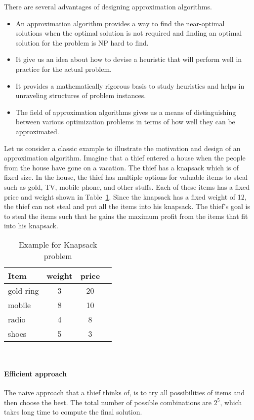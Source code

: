 There are several advantages of designing approximation algorithms.
 \begin{itemize}
  \item An approximation algorithm provides a way to find the near-optimal solutions when the optimal solution is not required and finding an optimal solution for the problem is NP hard to find.
  \item It give us an idea about how to devise a heuristic that will perform well in practice for the actual problem.
  \item It provides a mathematically rigorous basis to study heuristics and helps in unraveling structures of problem instances.
  \item The field of approximation algorithms gives us a means of distinguishing between various optimization problems in terms of how well they can be approximated.
 \end{itemize} 
Let us consider a classic example to illustrate the motivation and design of an approximation algorithm. 
Imagine that a thief entered a house when the people from the house have gone on a vacation.
The thief has a knapsack which is of fixed size. In the house, the thief has multiple options for valuable items to steal such as gold, TV, mobile phone, and other stuffs.
Each of these items has a fixed price and weight shown in Table~\ref{table:knapsack}. 
Since the knapsack has a fixed weight of 12, the thief can not steal and put all the items into his knapsack. 
The thief's goal is to steal the items such that he gains the maximum profit from the items that fit into his knapsack. 
\begin{center}
\begin{table}
\centering
\begin{tabular}{ |l|c|c|c| } 
 \hline
 Item & weight & price \\ 
  \hline
 gold ring & 3 & 20 \\
 mobile & 8 & 10 \\
 radio & 4 & 8 \\
 shoes & 5 & 3\\
 \hline
\end{tabular}
\\[10pt]
 \caption{Example for Knapsack problem}
\label{table:knapsack}
\end{table}
\end{center}
\paragraph{Efficient approach}
The naive approach that a thief thinks of, is to try all possibilities of items and then choose the best.
The total number of possible combinations are $2^5$, which takes long time to compute the final solution. 

